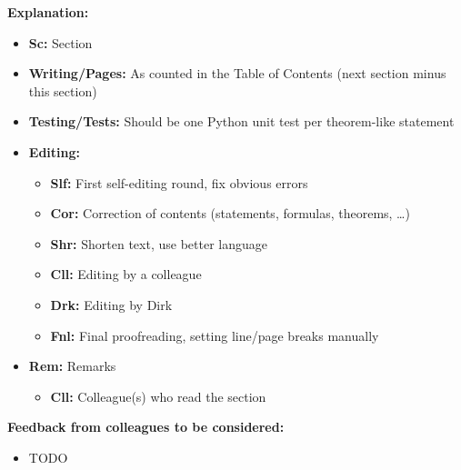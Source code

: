 \clearpage

\noindent
\textbf{Explanation:}

\begin{itemize}
  \item
  \textbf{Sc:}
  Section
  
  \item
  \textbf{Writing/Pages:}
  As counted in the Table of Contents
  (next section minus this section)
  
  \item
  \textbf{Testing/Tests:}
  Should be one Python unit test per theorem-like statement
  
  \item
  \textbf{Editing:}
  \begin{itemize}
    \item
    \textbf{Slf:}
    First self-editing round, fix obvious errors
    
    \item
    \textbf{Cor:}
    Correction of contents (statements, formulas, theorems, \dots)
    
    \item
    \textbf{Shr:}
    Shorten text, use better language
    
    \item
    \textbf{Cll:}
    Editing by a colleague
    
    \item
    \textbf{Drk:}
    Editing by Dirk
    
    \item
    \textbf{Fnl:}
    Final proofreading, setting line/page breaks manually
  \end{itemize}
  
  \item
  \textbf{Rem:}
  Remarks
  \begin{itemize}
    \item
    \textbf{Cll:}
    Colleague(s) who read the section
  \end{itemize}
\end{itemize}

\noindent
\textbf{Feedback from colleagues to be considered:}

\begin{itemize}
  \item
  TODO
\end{itemize}

\cleardoublepage
